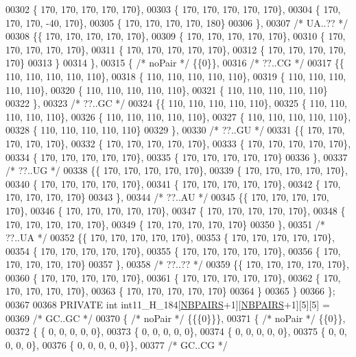 \begin{DoxyCode}
00302 \{ 170, 170, 170, 170, 170\},
00303 \{ 170, 170, 170, 170, 170\},
00304 \{ 170, 170, 170, -40, 170\},
00305 \{ 170, 170, 170, 170, 180\}
00306 \},
00307 \textcolor{comment}{/* UA..?? */}
00308 \{\{ 170, 170, 170, 170, 170\},
00309 \{ 170, 170, 170, 170, 170\},
00310 \{ 170, 170, 170, 170, 170\},
00311 \{ 170, 170, 170, 170, 170\},
00312 \{ 170, 170, 170, 170, 170\}
00313 \}
00314 \},
00315 \{ \textcolor{comment}{/* noPair */} \{\{0\}\},
00316 \textcolor{comment}{/* ??..CG */}
00317 \{\{ 110, 110, 110, 110, 110\},
00318 \{ 110, 110, 110, 110, 110\},
00319 \{ 110, 110, 110, 110, 110\},
00320 \{ 110, 110, 110, 110, 110\},
00321 \{ 110, 110, 110, 110, 110\}
00322 \},
00323 \textcolor{comment}{/* ??..GC */}
00324 \{\{ 110, 110, 110, 110, 110\},
00325 \{ 110, 110, 110, 110, 110\},
00326 \{ 110, 110, 110, 110, 110\},
00327 \{ 110, 110, 110, 110, 110\},
00328 \{ 110, 110, 110, 110, 110\}
00329 \},
00330 \textcolor{comment}{/* ??..GU */}
00331 \{\{ 170, 170, 170, 170, 170\},
00332 \{ 170, 170, 170, 170, 170\},
00333 \{ 170, 170, 170, 170, 170\},
00334 \{ 170, 170, 170, 170, 170\},
00335 \{ 170, 170, 170, 170, 170\}
00336 \},
00337 \textcolor{comment}{/* ??..UG */}
00338 \{\{ 170, 170, 170, 170, 170\},
00339 \{ 170, 170, 170, 170, 170\},
00340 \{ 170, 170, 170, 170, 170\},
00341 \{ 170, 170, 170, 170, 170\},
00342 \{ 170, 170, 170, 170, 170\}
00343 \},
00344 \textcolor{comment}{/* ??..AU */}
00345 \{\{ 170, 170, 170, 170, 170\},
00346 \{ 170, 170, 170, 170, 170\},
00347 \{ 170, 170, 170, 170, 170\},
00348 \{ 170, 170, 170, 170, 170\},
00349 \{ 170, 170, 170, 170, 170\}
00350 \},
00351 \textcolor{comment}{/* ??..UA */}
00352 \{\{ 170, 170, 170, 170, 170\},
00353 \{ 170, 170, 170, 170, 170\},
00354 \{ 170, 170, 170, 170, 170\},
00355 \{ 170, 170, 170, 170, 170\},
00356 \{ 170, 170, 170, 170, 170\}
00357 \},
00358 \textcolor{comment}{/* ??..?? */}
00359 \{\{ 170, 170, 170, 170, 170\},
00360 \{ 170, 170, 170, 170, 170\},
00361 \{ 170, 170, 170, 170, 170\},
00362 \{ 170, 170, 170, 170, 170\},
00363 \{ 170, 170, 170, 170, 170\}
00364 \}
00365 \}
00366 \};
00367 
00368 PRIVATE \textcolor{keywordtype}{int} int11\_H\_184[\hyperlink{constants_8h_a5e75221c779d618eab81e096f37e32ce}{NBPAIRS}+1][\hyperlink{constants_8h_a5e75221c779d618eab81e096f37e32ce}{NBPAIRS}+1][5][5] =
00369  \textcolor{comment}{/* GC..GC */}
00370 \{ \textcolor{comment}{/* noPair */} \{\{\{0\}\}\},
00371 \{ \textcolor{comment}{/* noPair */} \{\{0\}\},
00372 \{ \{  0, 0, 0, 0, 0\},
00373 \{  0, 0, 0, 0, 0\},
00374 \{  0, 0, 0, 0, 0\},
00375 \{  0, 0, 0, 0, 0\},
00376 \{  0, 0, 0, 0, 0\}\},
00377  \textcolor{comment}{/* GC..CG */}

\end{DoxyCode}
